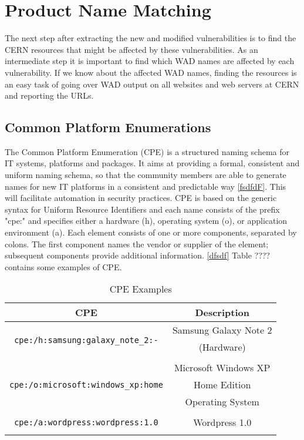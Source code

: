 \section{Product Name Matching}

The next step after extracting the new and modified vulnerabilities is to find the CERN resources that might be affected by these vulnerabilities. As an intermediate step it is important to find which WAD names are affected by each vulnerability. If we know about the affected WAD names, finding the resources is an easy task of going over WAD output on all websites and web servers at CERN and reporting the URLs. 
\subsection{Common Platform Enumerations}
The Common Platform Enumeration (CPE) is a structured naming schema for IT systems, platforms and packages. It aims at providing a formal, consistent and uniform naming schema, so that the community members are able to generate names for new IT platforms in a consistent and predictable way \ref{fsdfdF}. This will facilitate automation in security practices. CPE is based on the generic syntax for Uniform Resource Identifiers and each name consists of the prefix "cpe:" and specifies either a hardware (h), operating system (o), or application environment (a). Each element consists of one or more components, separated by colons. The first component names the vendor or supplier of the element; subsequent components provide additional information. \ref{dfsdf} 
Table ???? contains some examples of CPE. 

\begin{table}
\begin{center}
    \begin{tabular}{ | c | c | }
    
    \hline
	 
    CPE & Description  
    \\ \hline
    \multirow{3}{*}{\texttt{cpe:/h:samsung:galaxy\_note\_2:-}} & Samsung Galaxy Note 2 \\ & (Hardware) \\ & 
        \\ \hline
   \multirow{3}{*}{\texttt{cpe:/o:microsoft:windows\_xp:home}} & Microsoft Windows XP \\ & Home Edition \\ & Operating System
        \\ \hline
         \multirow{3}{*}{\texttt{cpe:/a:wordpress:wordpress:1.0}} &  \\ & Wordpress 1.0 \\ & 
        \\ \hline
    \end{tabular}
    \caption{CPE Examples}
    \label{table:sample_cpes}
   \end{center}
    
\end{table}

